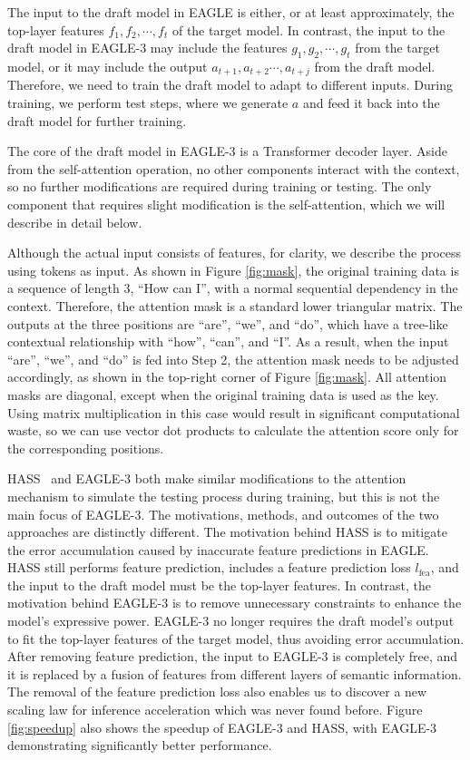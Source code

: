 \documentclass[11pt]{article}
\begin{document}
The input to the draft model in EAGLE is either, or at least approximately, the top-layer features $f_1,f_2,\cdots,f_t$ of the target model.
In contrast, the input to the draft model in EAGLE-3 may include the features $g_1,g_2,\cdots,g_t$ from the target model, or it may include the output $a_{t+1},a_{t+2}\cdots,a_{t+j}$ from the draft model. Therefore, we need to train the draft model to adapt to different inputs. During training, we perform test steps, where we generate $a$ and feed it back into the draft model for further training.

The core of the draft model in EAGLE-3 is a Transformer decoder layer. Aside from the self-attention operation, no other components interact with the context, so no further modifications are required during training or testing. The only component that requires slight modification is the self-attention, which we will describe in detail below.



Although the actual input consists of features, for clarity, we describe the process using tokens as input. As shown in Figure \ref{fig:mask}, the original training data is a sequence of length 3, ``How can I'', with a normal sequential dependency in the context. Therefore, the attention mask is a standard lower triangular matrix. The outputs at the three positions are ``are'', ``we'', and ``do'', which have a tree-like contextual relationship with ``how'', ``can'', and ``I''. As a result, when the input ``are'', ``we'', and ``do'' is fed into Step 2, the attention mask needs to be adjusted accordingly, as shown in the top-right corner of Figure \ref{fig:mask}. All attention masks are diagonal, except when the original training data is used as the key. Using matrix multiplication in this case would result in significant computational waste, so we can use vector dot products to calculate the attention score only for the corresponding positions.

HASS~\cite{zhang2024learning} and EAGLE-3 both make similar modifications to the attention mechanism to simulate the testing process during training, but this is not the main focus of EAGLE-3. The motivations, methods, and outcomes of the two approaches are distinctly different. The motivation behind HASS is to mitigate the error accumulation caused by inaccurate feature predictions in EAGLE. HASS still performs feature prediction, includes a feature prediction loss $l_\text{fea}$, and the input to the draft model must be the top-layer features. In contrast, the motivation behind EAGLE-3 is to remove unnecessary constraints to enhance the model's expressive power. EAGLE-3 no longer requires the draft model's output to fit the top-layer features of the target model, thus avoiding error accumulation. After removing feature prediction, the input to EAGLE-3 is completely free, and it is replaced by a fusion of features from different layers of semantic information. The removal of the feature prediction loss also enables us to discover a new scaling law for inference acceleration which was never found before. Figure \ref{fig:speedup} also shows the speedup of EAGLE-3 and HASS, with EAGLE-3 demonstrating significantly better performance.
\end{document}
